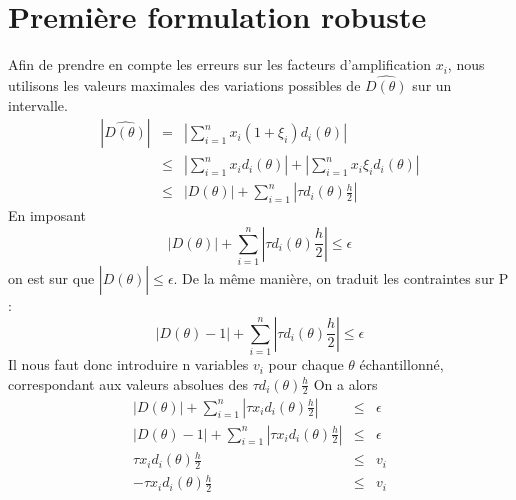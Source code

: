\section{Première formulation robuste}
Afin de prendre en compte les erreurs sur les facteurs d'amplification $x_i$, nous utilisons les valeurs maximales des variations possibles de $\hat{D(\theta)}$ sur un intervalle.\\
\begin{eqnarray}
|\hat{D(\theta)}| & = & |\sum_{i=1}^{n} x_i(1+\xi_i)d_i(\theta)| \nonumber \\
& \leq & |\sum_{i=1}^{n} x_i d_i(\theta)| + |\sum_{i=1}^{n} x_i \xi_i d_i(\theta)| \nonumber \\
& \leq & |D(\theta)| + \sum_{i=1}^{n} |\tau d_i(\theta)\frac{h}{2}| \nonumber
\end{eqnarray}
En imposant 
$$|D(\theta)| + \sum_{i=1}^{n} |\tau d_i(\theta)\frac{h}{2}|\leq \epsilon $$
on est sur que $|\hat{D(\theta)}|\leq \epsilon$. De la même manière, on traduit les contraintes sur P : 
$$|D(\theta)-1| + \sum_{i=1}^{n} |\tau d_i(\theta)\frac{h}{2}|\leq \epsilon $$
Il nous faut donc introduire n variables $v_i$ pour chaque $\theta$ échantillonné, correspondant aux valeurs absolues des $\tau d_i(\theta)\frac{h}{2}$
On a alors 
\begin{eqnarray}
|D(\theta)| + \sum_{i=1}^{n} |\tau x_i d_i(\theta)\frac{h}{2}| & \leq & \epsilon \nonumber \\
|D(\theta)-1| + \sum_{i=1}^{n} |\tau x_i d_i(\theta)\frac{h}{2}| & \leq & \epsilon \nonumber \\
\tau x_i d_i(\theta)\frac{h}{2} & \leq & v_i \nonumber \\
-\tau x_i d_i(\theta)\frac{h}{2} & \leq & v_i \nonumber 
\end{eqnarray}

